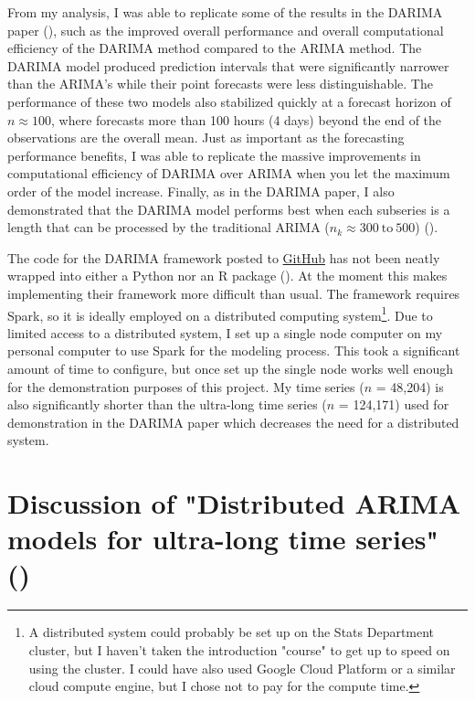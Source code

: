 \documentclass[
]{article}
\begin{document}
From my analysis, I was able to replicate some of the results in the DARIMA paper (\cite[p.~21-31]{wang_distributed_2020}), such as the improved overall performance and overall computational efficiency of the DARIMA method compared to the ARIMA method. The DARIMA model produced prediction intervals that were significantly narrower than the ARIMA's while their point forecasts were less distinguishable. The performance of these two models also stabilized quickly at a forecast horizon of $n \approx 100$, where forecasts more than 100 hours (4 days) beyond the end of the observations are the overall mean. Just as important as the forecasting performance benefits, I was able to replicate the massive improvements in computational efficiency of DARIMA over ARIMA when you let the maximum order of the model increase. Finally, as in the DARIMA paper, I also demonstrated that the DARIMA model performs best when each subseries is a length that can be processed by the traditional ARIMA ($n_k \approx 300 \mathrm{~to~}500$) (\cite[p.~31]{wang_distributed_2020}).

The code for the DARIMA framework posted to \href{https://github.com/xqnwang/darima}{GitHub} has not been neatly wrapped into either a Python nor an R package (\cite{wang_xqnwang_github_2020}). At the moment this makes implementing their framework more difficult than usual. The framework requires Spark, so it is ideally employed on a distributed computing system\footnote{A distributed system could probably be set up on the Stats Department cluster, but I haven't taken the introduction "course" to get up to speed on using the cluster. I could have also used Google Cloud Platform or a similar cloud compute engine, but I chose not to pay for the compute time.}. Due to limited access to a distributed system, I set up a single node computer on my personal computer to use Spark for the modeling process. This took a significant amount of time to configure, but once set up the single node works well enough for the demonstration purposes of this project. My time series ($n$ = 48,204) is also significantly shorter than the ultra-long time series ($n$ = 124,171) used for demonstration in the DARIMA paper which decreases the need for a distributed system.

\section*{Discussion of "Distributed ARIMA models for ultra-long time series" (\cite{wang_distributed_2020})}
\end{document}
